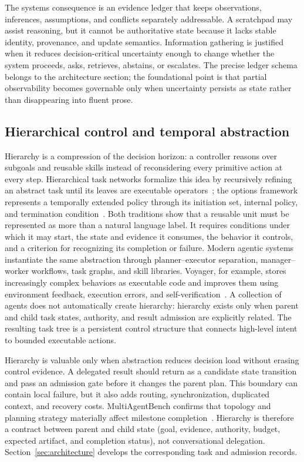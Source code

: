 The systems consequence is an evidence ledger that keeps observations, inferences, assumptions, and conflicts separately addressable. A scratchpad may assist reasoning, but it cannot be authoritative state because it lacks stable identity, provenance, and update semantics. Information gathering is justified when it reduces decision-critical uncertainty enough to change whether the system proceeds, asks, retrieves, abstains, or escalates. The precise ledger schema belongs to the architecture section; the foundational point is that partial observability becomes governable only when uncertainty persists as state rather than disappearing into fluent prose.

\subsection{Hierarchical control and temporal abstraction}

Hierarchy is a compression of the decision horizon: a controller reasons over subgoals and reusable skills instead of reconsidering every primitive action at every step. Hierarchical task networks formalize this idea by recursively refining an abstract task until its leaves are executable operators~\cite{erol1994htn}; the options framework represents a temporally extended policy through its initiation set, internal policy, and termination condition~\cite{sutton1999options}. Both traditions show that a reusable unit must be represented as more than a natural language label. It requires conditions under which it may start, the state and evidence it consumes, the behavior it controls, and a criterion for recognizing its completion or failure. Modern agentic systems instantiate the same abstraction through planner--executor separation, manager--worker workflows, task graphs, and skill libraries. Voyager, for example, stores increasingly complex behaviors as executable code and improves them using environment feedback, execution errors, and self-verification~\cite{wang2023voyager}. A collection of agents does not automatically create hierarchy: hierarchy exists only when parent and child task states, authority, and result admission are explicitly related. The resulting task tree is a persistent control structure that connects high-level intent to bounded executable actions.

Hierarchy is valuable only when abstraction reduces decision load without erasing control evidence. A delegated result should return as a candidate state transition and pass an admission gate before it changes the parent plan. This boundary can contain local failure, but it also adds routing, synchronization, duplicated context, and recovery costs. MultiAgentBench confirms that topology and planning strategy materially affect milestone completion~\cite{zhu2025multiagentbench}. Hierarchy is therefore a contract between parent and child state (goal, evidence, authority, budget, expected artifact, and completion status), not conversational delegation. Section~\ref{sec:architecture} develops the corresponding task and admission records.

